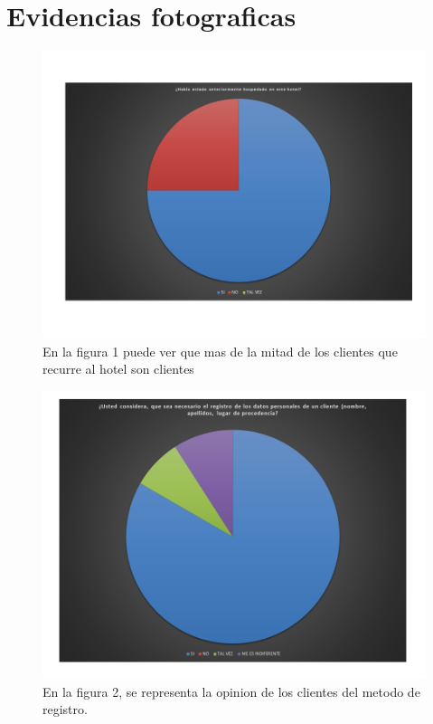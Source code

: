 \documentclass[a4paper,10pt]{report}
\begin{document}
\section{Evidencias fotograficas}
\begin{figure}[H]
\centering
\includegraphics[scale=.7]{imagenes/Diapositiva1.PNG}
\caption{En la figura 1 puede ver que mas de la mitad de los clientes que recurre al hotel son clientes }
\end{figure}

\begin{figure}[H]
\centering
\includegraphics[scale=.7]{imagenes/Diapositiva2.PNG}
\caption{En la figura 2, se representa la opinion de los clientes del metodo de registro. }
\end{figure}
\end{document}
